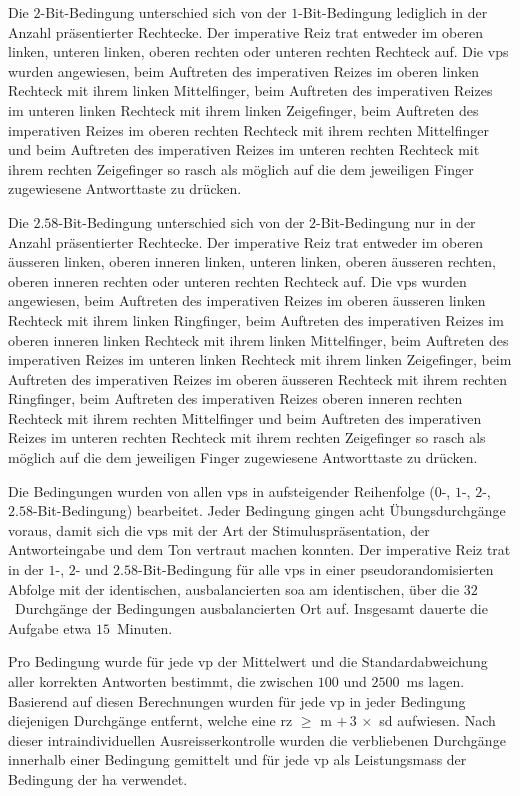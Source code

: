 \documentclass[11pt, twoside, a4paper]{book}		%
\begin{document}
Die $2$-Bit-Bedingung unterschied sich von der $1$-Bit-Bedingung lediglich in der Anzahl präsentierter Rechtecke. Der imperative Reiz trat entweder im oberen linken, unteren linken, oberen rechten oder unteren rechten Rechteck auf. Die \glspl{vp} wurden angewiesen, beim Auftreten des imperativen Reizes im oberen linken Rechteck mit ihrem linken Mittelfinger, beim Auftreten des imperativen Reizes im unteren linken Rechteck mit ihrem linken Zeigefinger,  beim Auftreten des imperativen Reizes im oberen rechten Rechteck mit ihrem rechten Mittelfinger und beim Auftreten des imperativen Reizes im unteren rechten Rechteck mit ihrem rechten Zeigefinger so rasch als möglich auf die dem jeweiligen Finger zugewiesene Antworttaste zu drücken.

Die $2.58$-Bit-Bedingung unterschied sich von der $2$-Bit-Bedingung nur in der Anzahl präsentierter Rechtecke. Der imperative Reiz trat entweder im oberen äusseren linken, oberen inneren linken, unteren linken, oberen äusseren rechten, oberen inneren rechten oder unteren rechten Rechteck auf. Die \glspl{vp} wurden angewiesen, beim Auftreten des imperativen Reizes im oberen äusseren linken Rechteck mit ihrem linken Ringfinger, beim Auftreten des imperativen Reizes im oberen inneren linken Rechteck mit ihrem linken Mittelfinger, beim Auftreten des imperativen Reizes im unteren linken Rechteck mit ihrem linken Zeigefinger, beim Auftreten des imperativen Reizes im oberen äusseren Rechteck mit ihrem rechten Ringfinger, beim Auftreten des imperativen Reizes oberen inneren rechten Rechteck mit ihrem rechten Mittelfinger und beim Auftreten des imperativen Reizes im unteren rechten Rechteck mit ihrem rechten Zeigefinger so rasch als möglich auf die dem jeweiligen Finger zugewiesene Antworttaste zu drücken.

Die Bedingungen wurden von allen \glspl{vp} in aufsteigender Reihenfolge ($0$-, $1$-, $2$-, $2.58$-Bit-Bedingung) bearbeitet. Jeder Bedingung gingen acht  Übungsdurchgänge voraus, damit sich die \glspl{vp} mit der Art der Stimuluspräsentation, der Antworteingabe und dem Ton vertraut machen konnten. 
Der imperative Reiz trat in der $1$-, $2$- und $2.58$-Bit-Bedingung für alle \glspl{vp} in einer pseudorandomisierten Abfolge mit der identischen, ausbalancierten \gls{soa} am identischen, über die $32$~Durchgänge der Bedingungen ausbalancierten Ort auf. Insgesamt dauerte die Aufgabe etwa $15$~Minuten. 

Pro Bedingung wurde für jede \gls{vp} der Mittelwert und die Standardabweichung aller korrekten Antworten bestimmt, die zwischen $100$ und $2500$~ms lagen. Basierend auf diesen Berechnungen wurden für jede \gls{vp} in jeder Bedingung diejenigen Durchgänge entfernt, welche eine \gls{rz} $\geq$ \gls{m} $+\,3\,\times$ \gls{sd} aufwiesen. Nach dieser intraindividuellen Ausreisserkontrolle wurden die verbliebenen Durchgänge innerhalb einer Bedingung gemittelt und für jede \gls{vp} als Leistungsmass der Bedingung der \gls{ha} verwendet.
\end{document}
